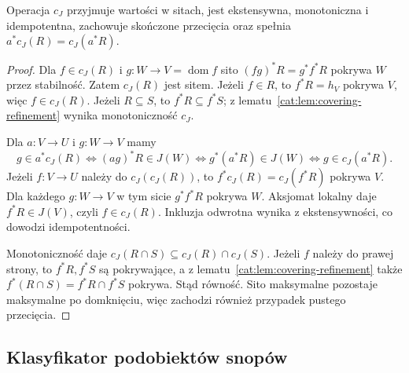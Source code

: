 \begin{lemat}\label{cat:lem:j-sieve-closure}
Operacja $c_J$ przyjmuje wartości w sitach, jest ekstensywna, monotoniczna i idempotentna, zachowuje skończone przecięcia oraz spełnia $a^*c_J(R)=c_J(a^*R)$.
\end{lemat}
\begin{proof}
Dla $f\in c_J(R)$ i $g:W\to V=\operatorname{dom}f$ sito $(fg)^*R=g^*f^*R$ pokrywa $W$ przez stabilność. Zatem $c_J(R)$ jest sitem. Jeżeli $f\in R$, to $f^*R=h_V$ pokrywa $V$, więc $f\in c_J(R)$. Jeżeli $R\subseteq S$, to $f^*R\subseteq f^*S$; z lematu~\ref{cat:lem:covering-refinement} wynika monotoniczność $c_J$.

Dla $a:V\to U$ i $g:W\to V$ mamy
\[
 g\in a^*c_J(R)\iff (ag)^*R\in J(W)
 \iff g^*(a^*R)\in J(W)\iff g\in c_J(a^*R).
\]
Jeżeli $f:V\to U$ należy do $c_J(c_J(R))$, to $f^*c_J(R)=c_J(f^*R)$ pokrywa $V$. Dla każdego $g:W\to V$ w tym sicie $g^*f^*R$ pokrywa $W$. Aksjomat lokalny daje $f^*R\in J(V)$, czyli $f\in c_J(R)$. Inkluzja odwrotna wynika z ekstensywności, co dowodzi idempotentności.

Monotoniczność daje $c_J(R\cap S)\subseteq c_J(R)\cap c_J(S)$. Jeżeli $f$ należy do prawej strony, to $f^*R,f^*S$ są pokrywające, a z lematu~\ref{cat:lem:covering-refinement} także $f^*(R\cap S)=f^*R\cap f^*S$ pokrywa. Stąd równość. Sito maksymalne pozostaje maksymalne po domknięciu, więc zachodzi również przypadek pustego przecięcia.
\end{proof}

\subsection{Klasyfikator podobiektów snopów}

